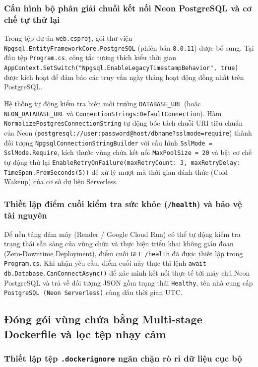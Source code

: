 \subsubsection{Cấu hình bộ phân giải chuỗi kết nối Neon PostgreSQL và cơ chế tự thử lại}

Trong tệp dự án \texttt{web.csproj}, gói thư viện \texttt{Npgsql.EntityFrameworkCore.PostgreSQL} (phiên bản \texttt{8.0.11}) được bổ sung. Tại đầu tệp \texttt{Program.cs}, công tắc tương thích kiểu thời gian \texttt{AppContext.SetSwitch("Npgsql.EnableLegacyTimestampBehavior", true)} được kích hoạt để đảm bảo các truy vấn ngày tháng hoạt động đồng nhất trên PostgreSQL.

Hệ thống tự động kiểm tra biến môi trường \texttt{DATABASE\_URL} (hoặc \texttt{NEON\_DATABASE\_URL} và \texttt{ConnectionStrings:DefaultConnection}). Hàm \texttt{NormalizePostgresConnectionString} tự động bóc tách chuỗi URI tiêu chuẩn của Neon (\texttt{postgresql://user:password@host/dbname?sslmode=require}) thành đối tượng \texttt{NpgsqlConnectionStringBuilder} với cấu hình \texttt{SslMode = SslMode.Require}, kích thước vùng chứa kết nối \texttt{MaxPoolSize = 20} và bật cơ chế tự động thử lại \texttt{EnableRetryOnFailure(maxRetryCount: 3, maxRetryDelay: TimeSpan.FromSeconds(5))} để xử lý mượt mà thời gian đánh thức (Cold Wakeup) của cơ sở dữ liệu Serverless.

\subsubsection{Thiết lập điểm cuối kiểm tra sức khỏe (\texttt{/health}) và bảo vệ tài nguyên}

Để nền tảng đám mây (Render / Google Cloud Run) có thể tự động kiểm tra trạng thái sẵn sàng của vùng chứa và thực hiện triển khai không gián đoạn (Zero-Downtime Deployment), điểm cuối \texttt{GET /health} đã được thiết lập trong \texttt{Program.cs}. Khi nhận yêu cầu, điểm cuối này thực thi lệnh \texttt{await db.Database.CanConnectAsync()} để xác minh kết nối thực tế tới máy chủ Neon PostgreSQL và trả về đối tượng JSON gồm trạng thái \texttt{Healthy}, tên nhà cung cấp \texttt{PostgreSQL (Neon Serverless)} cùng dấu thời gian UTC.

\subsection{Đóng gói vùng chứa bằng Multi-stage Dockerfile và lọc tệp nhạy cảm}

\subsubsection{Thiết lập tệp \texttt{.dockerignore} ngăn chặn rò rỉ dữ liệu cục bộ}

